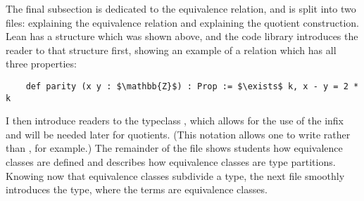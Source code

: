 The final subsection is dedicated to the equivalence relation, and is split into two files: 
 explaining the equivalence relation and
 explaining the quotient construction.
Lean has a structure  which was shown above, and the code library
introduces the reader to that structure first, showing an example of a relation
which has all three properties: 
\begin{lstlisting}
    def parity (x y : $\mathbb{Z}$) : Prop := $\exists$ k, x - y = 2 * k
\end{lstlisting}
I then introduce readers to the typeclass , which allows for the
use of the infix \lean{$\approx$} and will be needed later for quotients. 
(This notation allows one to write  rather than 
, for example.) The remainder of the file shows students how 
equivalence classes are defined and describes how equivalence classes are
type partitions. Knowing now that equivalence classes subdivide a type, 
the next file smoothly introduces the  type, 
where the terms are equivalence classes.

